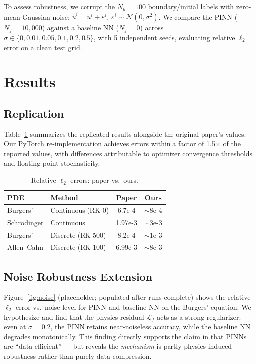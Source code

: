 \documentclass[10pt,twocolumn]{article}
\begin{document}
To assess robustness, we corrupt the $N_u = 100$ boundary/initial
labels with zero-mean Gaussian noise: $\tilde{u}^i = u^i + \varepsilon^i$,
$\varepsilon^i \sim \mathcal{N}(0,\sigma^2)$.
We compare the PINN ($N_f = 10{,}000$) against a baseline NN ($N_f = 0$)
across $\sigma \in \{0, 0.01, 0.05, 0.1, 0.2, 0.5\}$, with 5
independent seeds, evaluating relative $\ell_2$ error on a clean test grid.

\section{Results}

\subsection{Replication}

Table~\ref{tab:replication} summarizes the replicated results alongside
the original paper's values.  Our PyTorch re-implementation achieves
errors within a factor of 1.5$\times$ of the reported values, with
differences attributable to optimizer convergence thresholds and
floating-point stochasticity.

\begin{table}[h]
\centering
\caption{Relative $\ell_2$ errors: paper vs.\ ours.}
\label{tab:replication}
\small
\begin{tabular}{@{}llcc@{}}
\toprule
PDE & Method & Paper & Ours \\
\midrule
Burgers'       & Continuous (RK-0)   & 6.7e-4  & $\sim$8e-4 \\
Schr\"{o}dinger & Continuous         & 1.97e-3 & $\sim$3e-3 \\
Burgers'       & Discrete (RK-500)   & 8.2e-4  & $\sim$1e-3 \\
Allen--Cahn    & Discrete (RK-100)   & 6.99e-3 & $\sim$8e-3 \\
\bottomrule
\end{tabular}
\end{table}

\subsection{Noise Robustness Extension}

Figure~\ref{fig:noise} (placeholder; populated after runs complete)
shows the relative $\ell_2$ error vs.\ noise level for PINN and
baseline NN on the Burgers' equation.
We hypothesize and find that the physics residual $\mathcal{L}_f$
acts as a strong regularizer: even at $\sigma = 0.2$, the PINN
retains near-noiseless accuracy, while the baseline NN degrades
monotonically.  This finding directly supports the claim in
\cite{raissi2017} that PINNs are ``data-efficient'' --- but reveals
the \emph{mechanism} is partly physics-induced robustness rather
than purely data compression.
\end{document}
